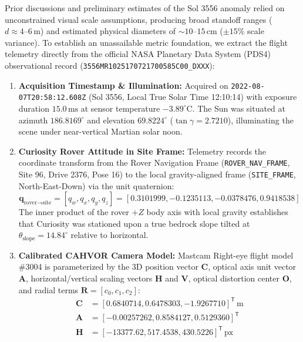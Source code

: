 \documentclass[11pt,a4paper]{article}
\newcommand{\pdsframe}{\texttt{3556MR}\allowbreak\texttt{102517}\allowbreak\texttt{0721700585C00\_DXXX}}
\begin{document}
Prior discussions and preliminary estimates of the Sol 3556 anomaly relied on unconstrained visual scale assumptions, producing broad standoff ranges ($d \approx 4\text{--}6\,\text{m}$) and estimated physical diameters of $\sim 10\text{--}15\,\text{cm}$ ($\pm 15\%$ scale variance). To establish an unassailable metric foundation, we extract the flight telemetry directly from the official NASA Planetary Data System (PDS4) observational record (\pdsframe):
\begin{enumerate}
    \item \textbf{Acquisition Timestamp \& Illumination:} Acquired on \texttt{2022-08-07T20:58:12.608Z} (Sol 3556, Local True Solar Time 12:10:14) with exposure duration $15.0\,\text{ms}$ at sensor temperature $-3.89^\circ\text{C}$. The Sun was situated at azimuth $186.8169^\circ$ and elevation $69.8224^\circ$ ($\tan \gamma = 2.7210$), illuminating the scene under near-vertical Martian solar noon.
    \item \textbf{Curiosity Rover Attitude in Site Frame:} Telemetry records the coordinate transform from the Rover Navigation Frame (\texttt{ROVER\_NAV\_FRAME}, Site 96, Drive 2376, Pose 16) to the local gravity-aligned frame (\texttt{SITE\_FRAME}, North-East-Down) via the unit quaternion:
    \begin{equation}
        \mathbf{q}_{\text{rover} \to \text{site}} = \left[q_w, q_x, q_y, q_z\right] = [0.3101999, -0.1235113, -0.0378476, 0.9418538]
    \end{equation}
    The inner product of the rover $+Z$ body axis with local gravity establishes that Curiosity was stationed upon a true bedrock slope tilted at $\theta_{\text{slope}} = 14.84^\circ$ relative to horizontal.
    \item \textbf{Calibrated CAHVOR Camera Model:} Mastcam Right-eye flight model \#3004 is parameterized by the 3D position vector $\mathbf{C}$, optical axis unit vector $\mathbf{A}$, horizontal/vertical scaling vectors $\mathbf{H}$ and $\mathbf{V}$, optical distortion center $\mathbf{O}$, and radial terms $\mathbf{R} = [c_0, c_1, c_2]$:
    \begin{equation}
        \begin{aligned}
            \mathbf{C} &= [0.6840714, 0.6478303, -1.9267710]^{\mathsf{T}}\,\text{m} \\
            \mathbf{A} &= [-0.00257262, 0.8584127, 0.5129360]^{\mathsf{T}} \\
            \mathbf{H} &= [-13377.62, 517.4538, 430.5226]^{\mathsf{T}}\,\text{px} \\

\end{aligned}
\end{equation}
\end{enumerate}
\end{document}
